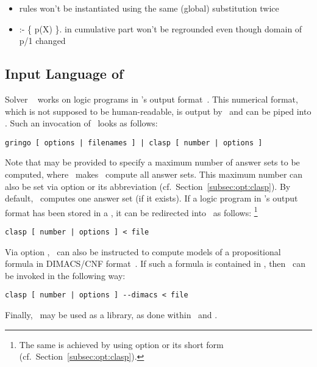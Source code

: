 \begin{newstuff}
	\begin{itemize}
		\item rules won't be instantiated using the same (global) substitution twice
		\item :- \{ p(X) \}. in cumulative part won't be regrounded even though domain of p/1 changed
	\end{itemize}
\end{newstuff}
\subsection{Input Language of \clasp}\label{subsec:lang:clasp}

Solver \clasp~\cite{gekanesc07b} works on logic programs in \lparse's
output format~\cite{lparseManual}.
This numerical format, which is not supposed to be human-readable,
is output by \gringo\ and can be piped into \clasp.
Such an invocation of \clasp\ looks as follows:
%
\begin{lstlisting}[numbers=none]
gringo [ options | filenames ] | clasp [ number | options ]
\end{lstlisting}
%
Note that  may be provided to specify a maximum number of answer sets
to be computed, where~ makes \clasp\ compute all answer sets.
This maximum number can also be set via
option  or its abbreviation 
(cf.\ Section~\ref{subsec:opt:clasp}).
By default, \clasp\ computes one answer set (if it exists).
If a logic program in \lparse's output format has been stored in a ,
it can be redirected into \clasp\ as follows:%
\footnote{%
  The same is achieved by using option  or its short form 
  (cf.\ Section~\ref{subsec:opt:clasp}).}
%
\begin{lstlisting}[numbers=none]
clasp [ number | options ] < file
\end{lstlisting}
%
Via option ,
\clasp\ can also be instructed to compute models of a propositional formula
in DIMACS/CNF format~\cite{dimacs}.
If such a formula is contained in ,
then \clasp\ can be invoked in the following way:
%
\begin{lstlisting}[numbers=none]
clasp [ number | options ] --dimacs < file
\end{lstlisting}
%
Finally, \clasp\ may be used as a library, as done within \clingo\ and \iclingo.


